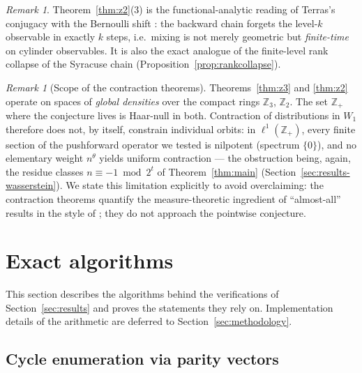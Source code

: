 \documentclass[11pt]{amsart}
\theoremstyle{definition}
\theoremstyle{remark}
\newtheorem{remark}[theorem]{Remark}
\newcommand{\Z}{\mathbb{Z}}
\newcommand{\Ztwo}{\Z_2}
\newcommand{\Zthree}{\Z_3}
\newcommand{\dW}{W_1}
\begin{document}
\begin{remark}\label{rem:duality}
Theorem~\ref{thm:z2}(3) is the functional-analytic reading of Terras's conjugacy with the Bernoulli shift \cite{terras1976}: the backward chain forgets the level-$k$ observable in exactly $k$ steps, i.e.\ mixing is not merely geometric but \emph{finite-time} on cylinder observables. It is also the exact analogue of the finite-level rank collapse of the Syracuse chain (Proposition~\ref{prop:rankcollapse}).
\end{remark}

\begin{remark}[Scope of the contraction theorems]\label{rem:scope}
Theorems~\ref{thm:z3} and \ref{thm:z2} operate on spaces of \emph{global densities} over the compact rings $\Zthree$, $\Ztwo$. The set $\Z_+$ where the conjecture lives is Haar-null in both. Contraction of distributions in $\dW$ therefore does not, by itself, constrain individual orbits: in $\ell^1(\Z_+)$, every finite section of the pushforward operator we tested is nilpotent (spectrum $\{0\}$), and no elementary weight $n^\theta$ yields uniform contraction --- the obstruction being, again, the residue classes $n \equiv -1 \bmod 2^t$ of Theorem~\ref{thm:main} (Section~\ref{sec:results-wasserstein}). We state this limitation explicitly to avoid overclaiming: the contraction theorems quantify the measure-theoretic ingredient of ``almost-all'' results in the style of \cite{terras1976,tao2022}; they do not approach the pointwise conjecture.
\end{remark}

\section{Exact algorithms}\label{sec:algorithms}

This section describes the algorithms behind the verifications of Section~\ref{sec:results} and proves the statements they rely on. Implementation details of the arithmetic are deferred to Section~\ref{sec:methodology}.

\subsection{Cycle enumeration via parity vectors}\label{sec:cycles-alg}
\end{document}
